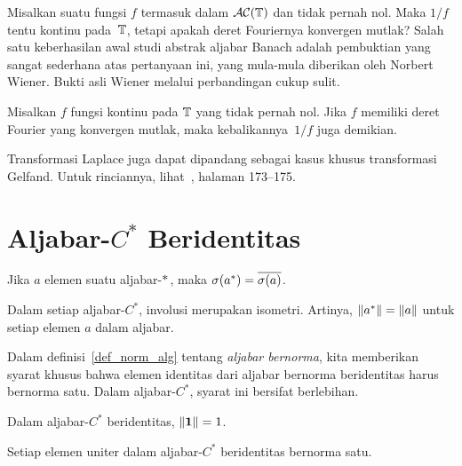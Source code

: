 Misalkan suatu fungsi $f$ termasuk dalam $\mathcal{AC}(\mathbb{T})$ dan tidak pernah nol. Maka $1/f$ tentu kontinu pada~$\mathbb{T}$,
tetapi apakah deret Fouriernya konvergen mutlak? Salah satu keberhasilan awal studi abstrak aljabar Banach
adalah pembuktian yang sangat sederhana atas pertanyaan ini, yang mula-mula diberikan oleh Norbert Wiener.
Bukti asli Wiener melalui perbandingan cukup sulit.

\begin{thm} Misalkan $f$ fungsi kontinu pada $\mathbb{T}$ yang tidak pernah
nol. Jika $f$ memiliki deret Fourier yang konvergen mutlak, maka kebalikannya~$1/f$ juga demikian.
\end{thm}

\begin{exam} Transformasi Laplace juga dapat dipandang sebagai kasus khusus transformasi Gelfand.
Untuk rinciannya, lihat~\cite{BaggettF:1979}, halaman 173--175.
\end{exam}













\section{Aljabar-$C^*$ Beridentitas}

\begin{prop} Jika $a$ elemen suatu aljabar-$*\,$, maka $\sigma(a^*) = \overline{\sigma(a)}$.
\end{prop}


\begin{prop}\label{001311} Dalam setiap aljabar-$C^*$, involusi merupakan isometri. Artinya,
$\lVert a^*\rVert = \lVert a\rVert$ untuk setiap elemen $a$ dalam aljabar.
\end{prop}

Dalam definisi~\ref{def_norm_alg} tentang \emph{aljabar bernorma}, kita memberikan syarat khusus bahwa
elemen identitas dari aljabar bernorma beridentitas harus bernorma satu. Dalam aljabar-$C^*$, syarat
ini bersifat berlebihan.

\begin{cor} Dalam aljabar-$C^*$ beridentitas, $\lVert\mathbf{1}\rVert = 1$.
\end{cor}

\begin{cor}\label{001311005fa} Setiap elemen uniter dalam aljabar-$C^*$ beridentitas bernorma satu.
\end{cor}

